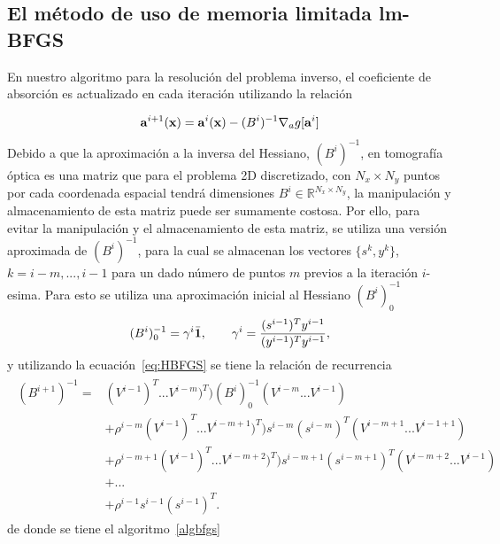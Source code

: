 \subsection{El método de uso de memoria limitada lm-BFGS}
\label{sec:lmBFGS}
En nuestro algoritmo para la resolución del problema inverso, el coeficiente 
de absorción es actualizado en cada iteración utilizando la relación 

\begin{equation}
\mathbf{a}^{i+1}(\mathbf{x})=\mathbf{a}^{i}(\mathbf{x})-(B^{i})^{-1} \nabla_a g[\mathbf{a}^i]
\label{eq:update2}
\end{equation}
Debido a que la aproximación a la inversa del Hessiano, $(B^i)^{-1}$, en tomografía óptica es una matriz 
que para el problema 2D discretizado, con $N_x \times N_y$ puntos 
por cada coordenada espacial tendrá dimensiones  $B^i\in \mathbb{R}^{N_x \times N_y}$, 
la manipulación y almacenamiento de esta matriz puede ser sumamente costosa. Por ello, 
para evitar la manipulación y el almacenamiento de esta matriz, se utiliza 
una versión aproximada de $(B^i)^{-1}$, para la cual se almacenan los vectores $\{s^k, y^k\}$, 
$k=i-m,...,i-1$ para un dado número de puntos $m$ previos a la iteración $i$-esima. 
Para esto se utiliza una aproximación inicial al Hessiano $(B^i)^{-1}_0$
\begin{equation}
(B^i)^{-1}_0=\gamma^i \bar{\mathbf{1}},\quad \quad \gamma^i=\frac{(s^{i-1})^T y^{i-1}}{(y^{i-1})^Ty^{i-1}},
\label{eq:initHess}
\end{equation}
y utilizando la ecuación~\eqref{eq:HBFGS} se tiene la relación de recurrencia
\begin{equation}
\begin{split}
\begin{aligned}
(B^{i+1})^{-1}=&(V^{i-1})^T...V^{i-m})^T) (B^i)^{-1}_0 (V^{i-m}...V^{i-1})  \\
&+\rho^{i-m} (V^{i-1})^T...V^{i-m+1})^T)s^{i-m} (s^{i-m})^T(V^{i-m+1}...V^{i-1+1}) \\
&+\rho^{i-m+1} (V^{i-1})^T...V^{i-m+2})^T)s^{i-m+1} (s^{i-m+1})^T(V^{i-m+2}...V^{i-1}) \\
&+...\\
&+\rho^{i-1} s^{i-1} (s^{i-1})^T. 
\end{aligned}
\end{split}
\label{eq:HBFGSrec}
\end{equation}
de donde se tiene el algoritmo~\eqref{algbfgs}~\cite{Byrd1995,Nocedal2006}

